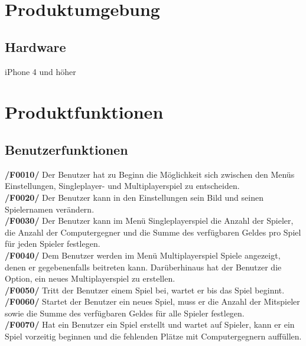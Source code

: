 \documentclass[a4paper,12pt,bibtotoc, parskip=full]{article}
\begin{document}
\section{Produktumgebung}
\subsection{Hardware}
iPhone 4 und höher
\newpage

\section{Produktfunktionen}
\subsection{Benutzerfunktionen}

\textbf{/F0010/} Der Benutzer hat zu Beginn die Möglichkeit sich zwischen den Menüs Einstellungen, Singleplayer- und Multiplayerspiel zu entscheiden.\\
\textbf{/F0020/} Der Benutzer kann in den Einstellungen sein Bild und seinen Spielernamen verändern.\\
\textbf{/F0030/} Der Benutzer kann im Menü Singleplayerspiel die Anzahl der Spieler, die Anzahl der Computergegner und die Summe des verfügbaren Geldes pro Spiel für jeden Spieler festlegen.\\
\textbf{/F0040/} Dem Benutzer werden im Menü Multiplayerspiel Spiele angezeigt, denen er gegebenenfalls beitreten kann. Darüberhinaus hat der Benutzer die Option, ein neues Multiplayerspiel zu erstellen.\\
\textbf{/F0050/} Tritt der Benutzer einem Spiel bei, wartet er bis das Spiel beginnt.\\
\textbf{/F0060/} Startet der Benutzer ein neues Spiel, muss er die Anzahl der Mitspieler sowie die Summe des verfügbaren Geldes für alle Spieler festlegen.\\
\textbf{/F0070/} Hat ein Benutzer ein Spiel erstellt und wartet auf Spieler, kann er ein Spiel vorzeitig beginnen und die fehlenden Plätze mit Computergegnern auffüllen.\\
\end{document}
